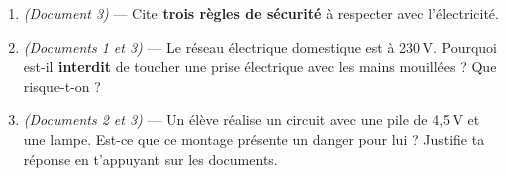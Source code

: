 \documentclass[11pt,a4paper]{article}
\newcommand{\cadreblanc}[1]{%
\medskip\framebox[\linewidth][c]{%
\rule{0mm}{#1mm}}\par
\medskip}
\begin{document}
\begin{enumerate}[label=\textbf{Q\arabic*.}, leftmargin=2cm, itemsep=6pt]
  \cadreblanc{30}

  \item \textit{(Document 3)} --- Cite \textbf{trois règles de sécurité} à respecter avec l'électricité.

  \cadreblanc{28}

  \item \textit{(Documents 1 et 3)} --- Le réseau électrique domestique est à 230\,V. Pourquoi est-il \textbf{interdit} de toucher une prise électrique avec les mains mouillées ? Que risque-t-on ?

  \cadreblanc{28}

  \item \textit{(Documents 2 et 3)} --- Un élève réalise un circuit avec une pile de 4,5\,V et une lampe. Est-ce que ce montage présente un danger pour lui ? Justifie ta réponse en t'appuyant sur les documents.

  \cadreblanc{28}

\end{enumerate}
\end{document}
